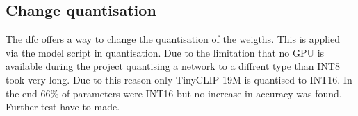 \subsection{Change quantisation}

The \acrshort{dfc} offers a way to change the quantisation of the weigths.
This is applied via the model script in quantisation.
Due to the limitation that no GPU is available during the project quantising a network to a diffrent type than INT8 took very long.
Due to this reason only TinyCLIP-19M is quantised to INT16.
In the end 66\% of parameters were INT16 but no increase in accuracy was found.
Further test have to made.
